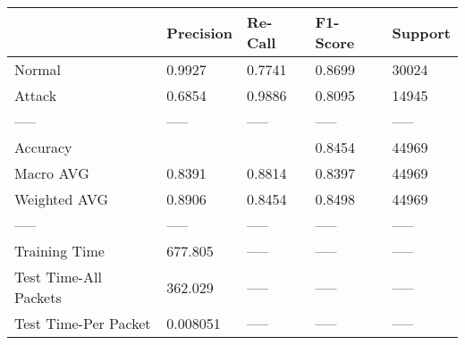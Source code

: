 \begin{tabular}{lllll}
\toprule
{} & Precision & Re-Call & F1-Score & Support \\
\midrule
Normal                &    0.9927 &  0.7741 &   0.8699 &   30024 \\
Attack                &    0.6854 &  0.9886 &   0.8095 &   14945 \\
-----                 &     ----- &   ----- &    ----- &   ----- \\
Accuracy              &           &         &   0.8454 &   44969 \\
Macro AVG             &    0.8391 &  0.8814 &   0.8397 &   44969 \\
Weighted AVG          &    0.8906 &  0.8454 &   0.8498 &   44969 \\
-----                 &     ----- &   ----- &    ----- &   ----- \\
Training Time         &   677.805 &   ----- &    ----- &   ----- \\
Test Time-All Packets &   362.029 &   ----- &    ----- &   ----- \\
Test Time-Per Packet  &  0.008051 &   ----- &    ----- &   ----- \\
\bottomrule
\end{tabular}
